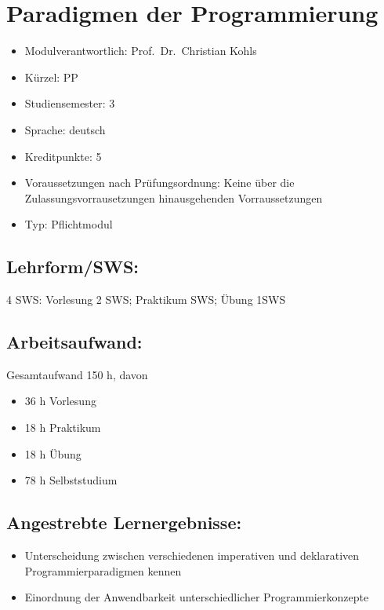 \chapter{Paradigmen der
Programmierung}\label{paradigmen-der-programmierung}

\begin{itemize}
\tightlist
\item
  Modulverantwortlich: Prof.~Dr.~Christian Kohls
\item
  Kürzel: PP
\item
  Studiensemester: 3
\item
  Sprache: deutsch
\item
  Kreditpunkte: 5
\item
  Voraussetzungen nach Prüfungsordnung: Keine über die
  Zulassungsvorrausetzungen hinausgehenden Vorraussetzungen
\item
  Typ: Pflichtmodul
\end{itemize}

\section*{Lehrform/SWS:}\label{lehrformsws-17}

4 SWS: Vorlesung 2 SWS; Praktikum SWS; Übung 1SWS

\section*{Arbeitsaufwand:}\label{arbeitsaufwand-16}

Gesamtaufwand 150 h, davon

\begin{itemize}
\tightlist
\item
  36 h Vorlesung
\item
  18 h Praktikum
\item
  18 h Übung
\item
  78 h Selbststudium
\end{itemize}

\section*{Angestrebte
Lernergebnisse:}\label{angestrebte-lernergebnisse-17}

\begin{itemize}
\tightlist
\item
  Unterscheidung zwischen verschiedenen imperativen und deklarativen
  Programmierparadigmen kennen
\item
  Einordnung der Anwendbarkeit unterschiedlicher Programmierkonzepte
\end{itemize}

